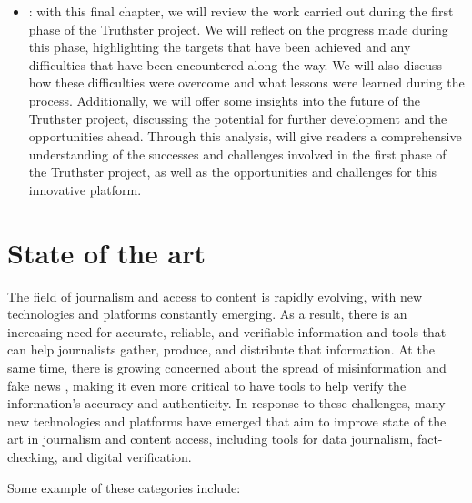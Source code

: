 \documentclass[target=mst,aauheader=]{thud}
\begin{document}
\begin{itemize}
    \item \textbf{}: with this final chapter, we will review the work carried out during the first phase of the Truthster project. We will reflect on the progress made during this phase, highlighting the targets that have been achieved and any difficulties that have been encountered along the way. We will also discuss how these difficulties were overcome and what lessons were learned during the process. Additionally, we will offer some insights into the future of the Truthster project, discussing the potential for further development and the opportunities ahead. Through this analysis, will give readers a comprehensive understanding of the successes and challenges involved in the first phase of the Truthster project, as well as the opportunities and challenges for this innovative platform.

\end{itemize}




\chapter{State of the art}
\label{chapter:stateOfTheArt}

The field of journalism and access to content is rapidly evolving, with new technologies and platforms constantly emerging. As a result, there is an increasing need for accurate, reliable, and verifiable information and tools that can help journalists gather, produce, and distribute that information. At the same time, there is growing concerned about the spread of misinformation and fake news \cite{DefiningFakeNews}, making it even more critical to have tools to help verify the information's accuracy and authenticity. In response to these challenges, many new technologies and platforms have emerged that aim to improve state of the art in journalism and content access, including tools for data journalism, fact-checking, and digital verification.\par
Some example of these categories include:
\end{document}
